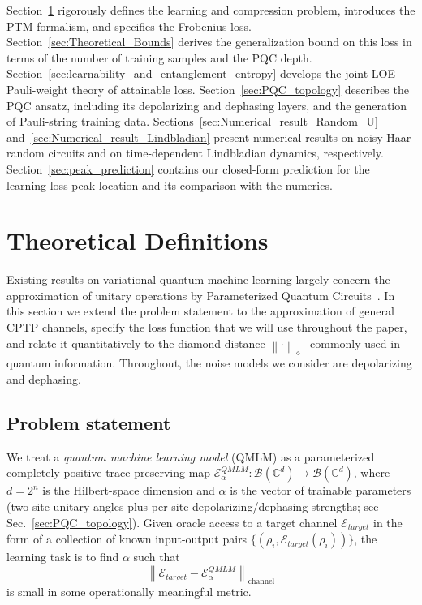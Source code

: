 \documentclass[%
 reprint,
superscriptaddress,
 amsmath,amssymb,
 aps,
]{revtex4-2}
\newcommand{\E}{\mathcal{E}}
\newcommand{\norm}[1]{\left\lVert#1\right\rVert}
\begin{document}
Section~\ref{sec:theoretical_definition} rigorously defines the learning and compression problem, introduces the PTM formalism, and specifies the Frobenius loss. Section~\ref{sec:Theoretical_Bounds} derives the generalization bound on this loss in terms of the number of training samples and the PQC depth. Section~\ref{sec:learnability_and_entanglement_entropy} develops the joint LOE--Pauli-weight theory of attainable loss. Section~\ref{sec:PQC_topology} describes the PQC ansatz, including its depolarizing and dephasing layers, and the generation of Pauli-string training data. Sections~\ref{sec:Numerical_result_Random_U} and~\ref{sec:Numerical_result_Lindbladian} present numerical results on noisy Haar-random circuits and on time-dependent Lindbladian dynamics, respectively. Section~\ref{sec:peak_prediction} contains our closed-form prediction for the learning-loss peak location and its comparison with the numerics.


\section{Theoretical Definitions}
\label{sec:theoretical_definition}
Existing results on variational quantum machine learning largely concern the approximation of unitary operations by Parameterized Quantum Circuits~\cite{khatri2019qaqc,caro2022generalization,sharma2020noiseresilience}. In this section we extend the problem statement to the approximation of general CPTP channels, specify the loss function that we will use throughout the paper, and relate it quantitatively to the diamond distance $\norm{\cdot}_\diamond$~\cite{kitaev1997quantum,watrous2018theory} commonly used in quantum information. Throughout, the noise models we consider are depolarizing and dephasing.

\subsection{Problem statement}

We treat a \emph{quantum machine learning model} (QMLM) as a parameterized completely positive trace-preserving map $\E^{QMLM}_{\alpha}:\mathcal{B}(\mathbb{C}^d)\to\mathcal{B}(\mathbb{C}^d)$, where $d=2^n$ is the Hilbert-space dimension and $\alpha$ is the vector of trainable parameters (two-site unitary angles plus per-site depolarizing/dephasing strengths; see Sec.~\ref{sec:PQC_topology}). Given oracle access to a target channel $\E_{target}$ in the form of a collection of known input-output pairs $\{(\rho_i,\E_{target}(\rho_i))\}$, the learning task is to find $\alpha$ such that
\begin{equation}
    \norm{\E_{target}-\E^{QMLM}_{\alpha}}_{\mathrm{channel}}
\end{equation}
is small in some operationally meaningful metric.
\end{document}
